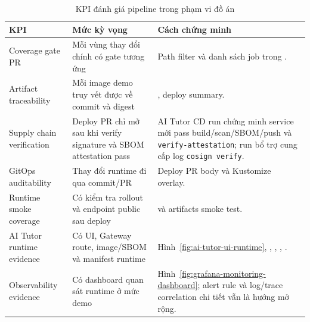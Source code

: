\begin{table}[H]
\centering
\caption{KPI đánh giá pipeline trong phạm vi đồ án}
\label{tab:pipeline-kpi}
\begin{tabularx}{\textwidth}{|p{}|p{}|Y|}
\hline
\textbf{KPI} & \textbf{Mức kỳ vọng} & \textbf{Cách chứng minh} \\
\hline
Coverage gate PR & Mỗi vùng thay đổi chính có gate tương ứng & Path filter và danh sách job trong . \\
Artifact traceability & Mỗi image demo truy vết được về commit và digest & , deploy summary. \\
Supply chain verification & Deploy PR chỉ mở sau khi verify signature và SBOM attestation pass & AI Tutor CD run chứng minh service mới pass build/scan/SBOM/push và \texttt{verify-attestation}; run bổ trợ cung cấp log \texttt{cosign verify}. \\
GitOps auditability & Thay đổi runtime đi qua commit/PR & Deploy PR body và Kustomize overlay. \\
Runtime smoke coverage & Có kiểm tra rollout và endpoint public sau deploy &  và artifacts smoke test. \\
AI Tutor runtime evidence & Có UI, Gateway route, image/SBOM và manifest runtime & Hình~\ref{fig:ai-tutor-ui-runtime}, , , , . \\
Observability evidence & Có dashboard quan sát runtime ở mức demo & Hình~\ref{fig:grafana-monitoring-dashboard}; alert rule và log/trace correlation chi tiết vẫn là hướng mở rộng. \\
\hline
\end{tabularx}
\end{table}

\clearpage

